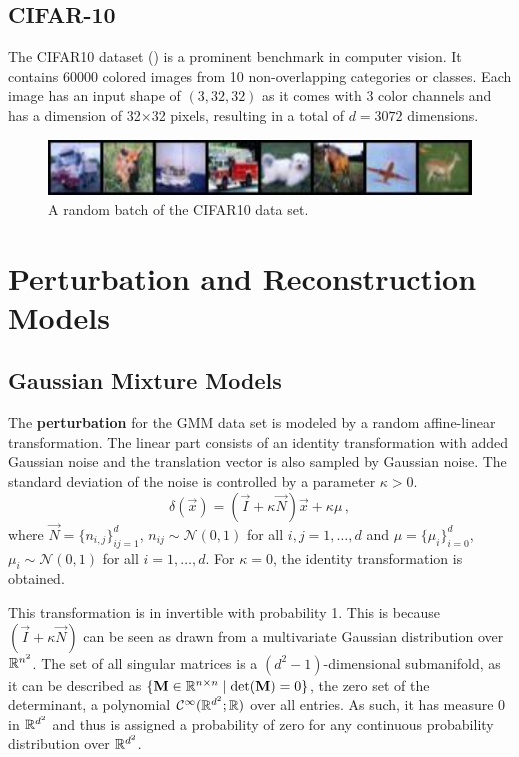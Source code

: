 \subsection{CIFAR-10}
The CIFAR10 dataset (\cite{CIFAR}) is a prominent benchmark in computer vision. 
It contains 60000 colored images from 10 non-overlapping categories or classes.
Each image has an input shape of $(3, 32, 32)$ as it comes with 3 color channels 
and has a dimension of 32$\times$32 pixels, resulting in a total of $d=3072$ dimensions.
\begin{figure}[h]
    \centering
    \includegraphics{figures/CIFAR10_plot.pdf}
    \caption{A random batch of the CIFAR10 data set.}
    \label{fig:CIFAR10_plot}
\end{figure}





\section{Perturbation and Reconstruction Models}
\label{sec:reconstruction_models}


\subsection{Gaussian Mixture Models}

The \textbf{perturbation} for the GMM data set is modeled by
a random affine-linear transformation.
The linear part consists of an identity transformation with added Gaussian noise
and the translation vector is also sampled by Gaussian noise.
The standard deviation of the noise is controlled by a parameter $\kappa > 0$.
\[
    \delta(\vec x) = (\vec I + \kappa \vec N)\vec x + \kappa \mu \,,
\]
where $\vec N = \{n_{i, j}\}_{i j = 1}^{d}$, $n_{ij} \sim \mathcal N (0, 1)$ for all $i, j = 1 , \ldots, d$
and 
$\mu = \{\mu_i\}_{i=0}^d$, $\mu_i \sim \mathcal N(0, 1)$ for all $i=1,\ldots,d$.
For $\kappa = 0$, the identity transformation is obtained.

This transformation is in invertible with probability 1.
This is because $(\vec I + \kappa \vec N)$ can be seen as drawn 
from a multivariate Gaussian distribution over $\mathbb{R}^{n^2}$.
The set of all singular matrices is a $(d^2-1)$-dimensional submanifold,
as it can be described as $\{\mathbf M \in \mathbb{R}^{n\times n} \mid \det(\mathbf M) = 0\}$, 
the zero set of the determinant,
a polynomial $\mathcal C^{\infty}(\mathbb{R}^{d^2};\mathbb{R})$ over all entries.
As such, it has measure 0 in $\mathbb{R}^{d^2}$ and thus is assigned a probability of zero
for any continuous probability distribution over $\mathbb{R}^{d^2}$.


